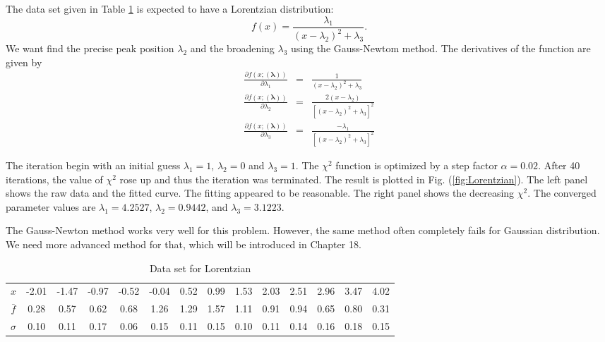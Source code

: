 The data set given in Table \ref{tbl:Lorentzian} is expected to have a Lorentzian distribution:  
\begin{equation}
f(x) = \frac{\lambda_1}{(x-\lambda_2)^2+\lambda_3}.
\end{equation}
We want find the precise peak position $\lambda_2$ and the broadening $\lambda_3$ using the Gauss-Newtom method.
The derivatives of the function are given by
\begin{subequations}
\begin{eqnarray}
\frac{\partial f(x;(\boldsymbol{\lambda}))}{\partial \lambda_1} &=&  \frac{1}{(x-\lambda_2)^2+\lambda_3}\\
\frac{\partial f(x;(\boldsymbol{\lambda}))}{\partial \lambda_2} &=&  \frac{2 (x-\lambda_2)}{[(x-\lambda_2)^2+\lambda_3]^2}\\
\frac{\partial f(x;(\boldsymbol{\lambda}))}{\partial \lambda_3} &=&  \frac{-\lambda_1}{[(x-\lambda_2)^2+\lambda_3]^2}
\end{eqnarray}
\end{subequations}

The iteration begin with an initial guess $\lambda_1=1$, $\lambda_2=0$ and $\lambda_3=1$.  The $\chi^2$ function is optimized by a step factor $\alpha=0.02$.  After 40 iterations, the value of $\chi^2$ rose up and thus the iteration was terminated.  The result is plotted in Fig. (\ref{fig:Lorentzian}).  The left panel shows the raw data and the fitted curve.  The fitting appeared to be reasonable.  The right panel shows the decreasing $\chi^2$.  The converged parameter values are $\lambda_1=4.2527$, $\lambda_2=0.9442$, and $\lambda_3=3.1223$.

The Gauss-Newton method works very well for this problem.  However, the same method often completely fails for Gaussian distribution. We need more advanced method for that, which  will be introduced in Chapter 18.

\begin{table}
\centering
\caption{Data set for Lorentzian}\label{tbl:Lorentzian}
\begin{tabular}{c|ccccccccccccc}
\hline
$x$ &-2.01 & -1.47 &-0.97 &-0.52 &-0.04 &0.52 &0.99 & 1.53 & 2.03 &2.51 &2.96 &3.47 &4.02 \\
$\bar{f}$&0.28 & 0.57 &0.62 &0.68 &1.26 &1.29 &1.57 &1.11 & 0.91 &0.94 &0.65 &0.80 &0.31 \\
$\sigma$&0.10 & 0.11 &0.17 &0.06 &0.15 &0.11 &0.15 & 0.10 & 0.11 &0.14 &0.16 &0.18 &0.15 \\
\hline
\end{tabular}

\end{table}

